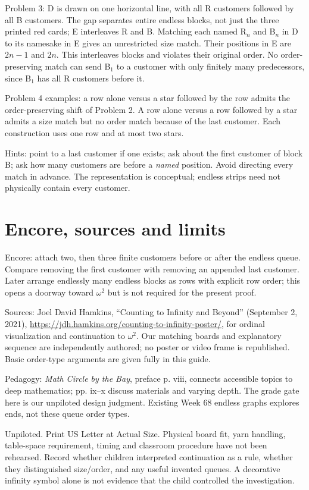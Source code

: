 \documentclass[11pt,letterpaper]{article}
\begin{document}
Problem 3: D is drawn on one horizontal line, with all R customers followed by all B customers. The gap separates entire endless blocks, not just the three printed red cards; E interleaves R and B. Matching each named R$_n$ and B$_n$ in D to its namesake in E gives an unrestricted size match. Their positions in E are $2n-1$ and $2n$. This interleaves blocks and violates their original order. No order-preserving match can send B$_1$ to a customer with only finitely many predecessors, since B$_1$ has all R customers before it.

Problem 4 examples: a row alone versus a star followed by the row admits the order-preserving shift of Problem 2. A row alone versus a row followed by a star admits a size match but no order match because of the last customer. Each construction uses one row and at most two stars.

Hints: point to a last customer if one exists; ask about the first customer of block B; ask how many customers are before a \emph{named} position. Avoid directing every match in advance. The representation is conceptual; endless strips need not physically contain every customer.
\newpage
\section*{Encore, sources and limits}
Encore: attach two, then three finite customers before or after the endless queue. Compare removing the first customer with removing an appended last customer. Later arrange endlessly many endless blocks as rows with explicit row order; this opens a doorway toward $\omega^2$ but is not required for the present proof.

Sources: Joel David Hamkins, ``Counting to Infinity and Beyond'' (September 2, 2021), \url{https://jdh.hamkins.org/counting-to-infinity-poster/}, for ordinal visualization and continuation to $\omega^2$. Our matching boards and explanatory sequence are independently authored; no poster or video frame is republished. Basic order-type arguments are given fully in this guide.

Pedagogy: \emph{Math Circle by the Bay}, preface p. viii, connects accessible topics to deep mathematics; pp. ix--x discuss materials and varying depth. The grade gate here is our unpiloted design judgment. Existing Week 68 endless graphs explores ends, not these queue order types.

Unpiloted. Print US Letter at Actual Size. Physical board fit, yarn handling, table-space requirement, timing and classroom procedure have not been rehearsed. Record whether children interpreted continuation as a rule, whether they distinguished size/order, and any useful invented queues. A decorative infinity symbol alone is not evidence that the child controlled the investigation.
\end{document}
